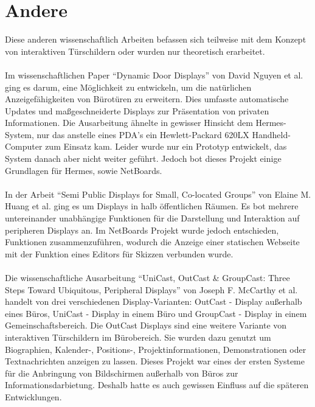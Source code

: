 \section{Andere}
Diese anderen wissenschaftlich Arbeiten befassen sich teilweise mit dem Konzept von interaktiven Türschildern oder wurden nur theoretisch erarbeitet.
\\\\
Im wissenschaftlichen Paper ``Dynamic Door Displays'' von David Nguyen et al. ging es darum, eine Möglichkeit zu entwickeln, um die natürlichen Anzeigefähigkeiten von Bürotüren zu erweitern. Dies umfasste automatische Updates und maßgeschneiderte Displays zur Präsentation von privaten Informationen\cite{nguyen:dyn-door-disp}. Die Ausarbeitung ähnelte in gewisser Hinsicht dem Hermes-System, nur das anstelle eines PDA's ein Hewlett-Packard 620LX Handheld-Computer zum Einsatz kam.
Leider wurde nur ein Prototyp entwickelt, das System danach aber nicht weiter geführt. Jedoch bot dieses Projekt einige Grundlagen für Hermes, sowie NetBoards.
\\\\
In der Arbeit ``Semi Public Displays for Small, Co-located Groups'' von Elaine M. Huang et al. ging es um Displays in halb öffentlichen Räumen.  Es bot mehrere untereinander unabhängige Funktionen für die Darstellung und Interaktion auf peripheren Displays an. Im NetBoards Projekt wurde jedoch entschieden, Funktionen zusammenzuführen, wodurch \bspw die Anzeige einer statischen Webseite mit der Funktion eines Editors für Skizzen verbunden wurde.
\\\\
Die wissenschaftliche Ausarbeitung ``UniCast, OutCast \& GroupCast: Three Steps Toward Ubiquitous, Peripheral Displays'' von Joseph F. McCarthy et al. handelt von drei verschiedenen Display-Varianten: OutCast - Display außerhalb eines Büros, UniCast - Display in einem Büro und GroupCast - Display in einem Gemeinschaftsbereich\cite{mccarthy:2001}. Die OutCast Displays sind eine weitere Variante von interaktiven Türschildern im Bürobereich. Sie wurden dazu genutzt um Biographien, Kalender-, Positions-, Projektinformationen, Demonstrationen oder Textnachrichten anzeigen zu lassen. Dieses Projekt war eines der ersten Systeme für die Anbringung von Bildschirmen außerhalb von Büros zur Informationsdarbietung. Deshalb hatte es auch gewissen Einfluss auf die späteren Entwicklungen.
